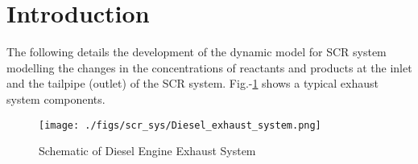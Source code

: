 \section{Introduction}

The following details the development of the dynamic model for SCR system
modelling the changes in the concentrations of reactants and products at the
inlet and the tailpipe (outlet) of the SCR system.
Fig.-\ref{fig::diesel_exhaust} shows a typical exhaust system components.

\begin{figure}[H]
    \centering
    \texttt{[image: ./figs/scr\_sys/Diesel\_exhaust\_system.png]}
\caption{Schematic of Diesel Engine Exhaust System \cite{devarakonda2009model}}
    \label{fig::diesel_exhaust}
\end{figure}
